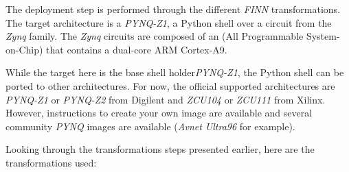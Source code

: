 The deployment step is performed through the different \emph{FINN} transformations. The target architecture is a \emph{PYNQ-Z1}, a Python shell over a circuit from the \emph{Zynq} family. The \emph{Zynq} circuits are composed of an  (All Programmable System-on-Chip) that contains a dual-core ARM Cortex-A9.

While the target here is the base shell holder\emph{PYNQ-Z1}, the Python shell can be ported to other architectures. For now, the official supported architectures are \emph{PYNQ-Z1} or \emph{PYNQ-Z2} from Digilent and \emph{ZCU104} or \emph{ZCU111} from Xilinx. However, instructions to create your own image are available and several community \emph{PYNQ} images are available (\emph{Avnet Ultra96} for example).

Looking through the transformations steps presented earlier, here are the transformations used:

